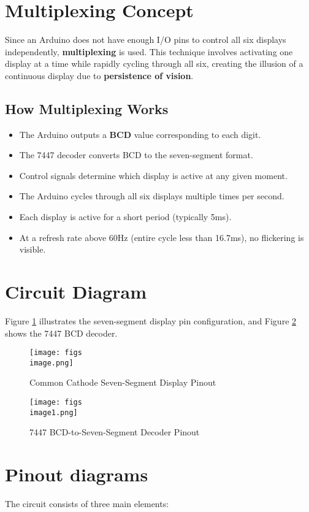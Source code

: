 \documentclass[a4paper,12pt]{article}
\begin{document}
\section{Multiplexing Concept}
Since an Arduino does not have enough I/O pins to control all six displays independently, \textbf{multiplexing} is used. This technique involves activating one display at a time while rapidly cycling through all six, creating the illusion of a continuous display due to \textbf{persistence of vision}.

\subsection{How Multiplexing Works}
\begin{itemize}
    \item The Arduino outputs a \textbf{BCD} value corresponding to each digit.
    \item The 7447 decoder converts BCD to the seven-segment format.
    \item Control signals determine which display is active at any given moment.
    \item The Arduino cycles through all six displays multiple times per second.
    \item Each display is active for a short period (typically 5ms).
    \item At a refresh rate above 60Hz (entire cycle less than 16.7ms), no flickering is visible.
\end{itemize}

\section{Circuit Diagram}
Figure \ref{fig:7seg} illustrates the seven-segment display pin configuration, and Figure \ref{fig:7447} shows the 7447 BCD decoder.

\begin{figure}[h]
    \centering
    \texttt{[image: figs\\image.png]}
    \caption{Common Cathode Seven-Segment Display Pinout}
    \label{fig:7seg}
\end{figure}

\begin{figure}[h]
    \centering
    \texttt{[image: figs\\image1.png]}
    \caption{7447 BCD-to-Seven-Segment Decoder Pinout}
    \label{fig:7447}
\end{figure}

\section{Pinout diagrams}
The circuit consists of three main elements:
\end{document}
